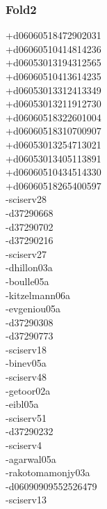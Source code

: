 \begin{multicols}{4}
\subsubsection*{Fold2}
+d06060518472902031\\
+d06060510414814236\\
+d06053013194312565\\
+d06060510413614235\\
+d06053013312413349\\
+d06053013211912730\\
+d06060518322601004\\
+d06060518310700907\\
+d06053013254713021\\
+d06053013405113891\\
+d06060510434514330\\
+d06060518265400597\\
-sciserv28\\
-d37290668\\
-d37290702\\
-d37290216\\
-sciserv27\\
-dhillon03a\\
-boulle05a\\
-kitzelmann06a\\
-evgeniou05a\\
-d37290308\\
-d37290773\\
-sciserv18\\
-binev05a\\
-sciserv48\\
-getoor02a\\
-eibl05a\\
-sciserv51\\
-d37290232\\
-sciserv4\\
-agarwal05a\\
-rakotomamonjy03a\\
-d06090909552526479\\
-sciserv13\\

\end{multicols}
